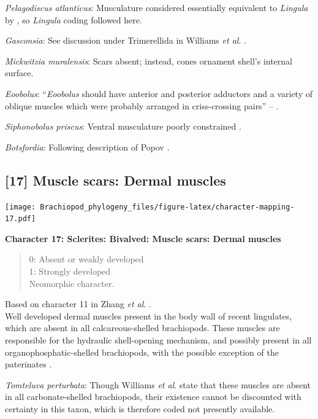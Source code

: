 \documentclass[]{book}
\theoremstyle{definition}
\theoremstyle{definition}
\theoremstyle{definition}
\theoremstyle{remark}
\begin{document}
\emph{Pelagodiscus atlanticus}: Musculature considered essentially
equivalent to \emph{Lingula} by
\citet{Williams2000BrachiopodaLinguliformea}, so \emph{Lingula} coding
followed here.

\emph{Gasconsia}: See discussion under Trimerellida in Williams \emph{et
al}. \citeyearpar{Williams2000BrachiopodaLinguliformea}.

\emph{Mickwitzia muralensis}: Scars absent; instead, cones ornament
shell's internal surface.

\emph{Eoobolus}: ``\emph{Eoobolus} should have anterior and posterior
adductors and a variety of oblique muscles which were probably arranged
in criss-crossing pairs'' -- \citet{Balthasar2009Thebrachiopod}.

\emph{Siphonobolus priscus}: Ventral musculature poorly constrained
\citep{Williams2000BrachiopodaLinguliformea, Popov2009Earlyontogeny}.

\emph{Botsfordia}: Following description of Popov
\citeyearpar{Popov1992TheCambrian}.

\hypertarget{muscle-scars-dermal-muscles}{%
\subsection*{{[}17{]} Muscle scars: Dermal
muscles}\label{muscle-scars-dermal-muscles}}

\texttt{[image: Brachiopod\_phylogeny\_files/figure-latex/character-mapping-17.pdf]}

\textbf{Character 17: Sclerites: Bivalved: Muscle scars: Dermal muscles}

\begin{quote}
0: Absent or weakly developed\\
1: Strongly developed\\
Neomorphic character.
\end{quote}

Based on character 11 in Zhang \emph{et al}.
\citeyearpar{Zhang2014Anearly}.\\
Well developed dermal muscles present in the body wall of recent
lingulates, which are absent in all calcareous-shelled brachiopods.
These muscles are responsible for the hydraulic shell-opening mechanism,
and possibly present in all organophosphatic-shelled brachiopods, with
the possible exception of the paterinates
\citep[p.~32]{Williams2000BrachiopodaLinguliformea}.

\emph{Tomteluva perturbata}: Though Williams \emph{et al}.
\citeyearpar[P.32]{Williams2000BrachiopodaLinguliformea} state that
these muscles are absent in all carbonate-shelled brachiopods, their
existence cannot be discounted with certainty in this taxon, which is
therefore coded not presently available.
\end{document}
